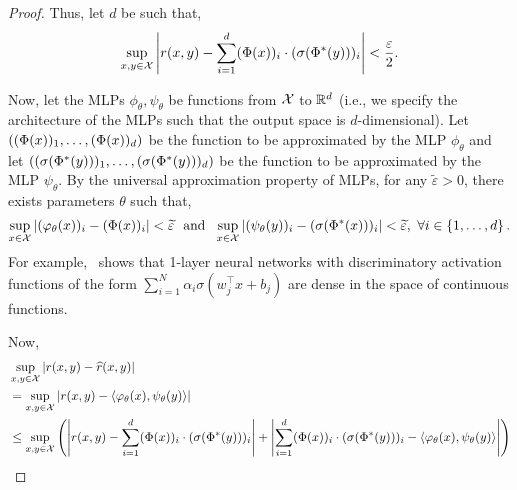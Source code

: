 \begin{proof}
    Thus, let $d$ be such that,
    \begin{equation}\label{eq:thm1_proof_eq1}
        \sup_{x,y \in \calX} \abs{r(x, y) - \sum_{i=1}^{d} (\Phi(x))_i \cdot (\sigma(\Phi^*(y)))_i} < \frac{\varepsilon}{2}.
    \end{equation}

    Now, let the MLPs $\phi_\theta, \psi_\theta$ be functions from ${\mathcal{X}}$ to $\mathbb{R}^{d}$ (i.e., we specify the architecture of the MLPs such that the output space is $d$-dimensional). Let $\left((\Phi(x))_1, \ldots, (\Phi(x))_{d}\right)$ be the function to be approximated by the MLP $\phi_\theta$ and let $\left((\sigma(\Phi^*(y)))_1, \ldots, (\sigma(\Phi^*(y)))_{d}\right)$ be the function to be approximated by the MLP $\psi_\theta$. By the universal approximation property of MLPs, for any $\tilde{\varepsilon} > 0$, there exists parameters $\theta$ such that,
    \begin{equation}\label{eq:thm1_proof_eq2}
        \sup_{x \in \calX} \abs{(\phi_\theta(x))_i - (\Phi(x))_{i}} < \tilde{\varepsilon} \ \text{ and } \ \sup_{x \in \calX} \abs{(\psi_\theta(y))_i - (\sigma(\Phi^*(x)))_{i}} < \tilde{\varepsilon}, \ \forall i \in \set{1, \ldots, d}.
    \end{equation}
    For example,~\parencite{cybenkoApproximationSuperpositions1989} shows that 1-layer neural networks with discriminatory activation functions of the form $\sum_{i=1}^{N} \alpha_i \sigma(w_j^\top x + b_j)$ are dense in the space of continuous functions.

    Now,
    \begin{align*}
        &\sup_{x,y \in \calX} \abs{r(x,y) - \hat{r}(x,y)} \\
        &= \sup_{x,y \in \calX} \abs{r(x,y) - \iprod{\phi_\theta(x)}{\psi_\theta(y)}} \\
        &\leq \sup_{x,y\in \calX} \paren{\abs{r(x,y) - \sum_{i=1}^{d} (\Phi(x))_i \cdot (\sigma(\Phi^*(y)))_i} + \abs{\sum_{i=1}^{d} (\Phi(x))_i \cdot (\sigma(\Phi^*(y)))_i - \iprod{\phi_\theta(x)}{\psi_\theta(y)}}} \\
    \end{align*}


\end{proof}
